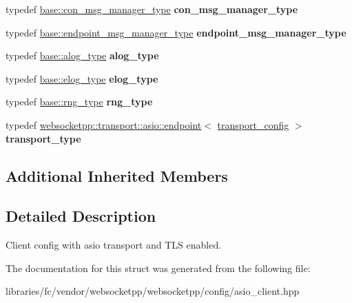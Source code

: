 \begin{DoxyCompactItemize}
typedef \mbox{\hyperlink{classwebsocketpp_1_1message__buffer_1_1alloc_1_1con__msg__manager}{base\+::con\+\_\+msg\+\_\+manager\+\_\+type}} {\bfseries con\+\_\+msg\+\_\+manager\+\_\+type}
\item 
\mbox{\label{structwebsocketpp_1_1config_1_1asio__tls__client_aeced2a30e2fe4f66d9c79c9e02dc6574}} 
typedef \mbox{\hyperlink{classwebsocketpp_1_1message__buffer_1_1alloc_1_1endpoint__msg__manager}{base\+::endpoint\+\_\+msg\+\_\+manager\+\_\+type}} {\bfseries endpoint\+\_\+msg\+\_\+manager\+\_\+type}
\item 
\mbox{\label{structwebsocketpp_1_1config_1_1asio__tls__client_ace0e6858f14ca5a442e3217c1afc8f6f}} 
typedef \mbox{\hyperlink{classwebsocketpp_1_1log_1_1basic}{base\+::alog\+\_\+type}} {\bfseries alog\+\_\+type}
\item 
\mbox{\label{structwebsocketpp_1_1config_1_1asio__tls__client_a3d1c84bbdde66356494584dd9ea5818c}} 
typedef \mbox{\hyperlink{structwebsocketpp_1_1config_1_1core__client_a24f1bae9e8a92bf7950153ed39eaffb8}{base\+::elog\+\_\+type}} {\bfseries elog\+\_\+type}
\item 
\mbox{\label{structwebsocketpp_1_1config_1_1asio__tls__client_ac546cdbb58db76187d9fac5426eba65e}} 
typedef \mbox{\hyperlink{structwebsocketpp_1_1config_1_1core__client_adacb3a0ec249a2dea11871f299cf660f}{base\+::rng\+\_\+type}} {\bfseries rng\+\_\+type}
\item 
\mbox{\label{structwebsocketpp_1_1config_1_1asio__tls__client_a24a07a9b1d8bb48d67317a46acb6eef6}} 
typedef \mbox{\hyperlink{classwebsocketpp_1_1transport_1_1asio_1_1endpoint}{websocketpp\+::transport\+::asio\+::endpoint}}$<$ \mbox{\hyperlink{structwebsocketpp_1_1config_1_1asio__tls__client_1_1transport__config}{transport\+\_\+config}} $>$ {\bfseries transport\+\_\+type}
\end{DoxyCompactItemize}
\subsection*{Additional Inherited Members}


\subsection{Detailed Description}
Client config with asio transport and T\+LS enabled. 

The documentation for this struct was generated from the following file\+:\begin{DoxyCompactItemize}
\item 
libraries/fc/vendor/websocketpp/websocketpp/config/asio\+\_\+client.\+hpp\end{DoxyCompactItemize}

